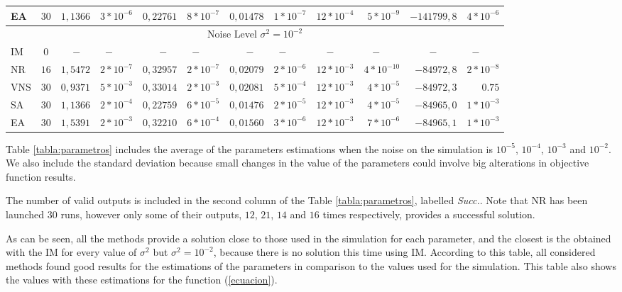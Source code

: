 \documentclass{sig-alternate}
\begin{document}
\begin{table*}
\begin{center}
{\begin{tabular}{lc|rrrrrrrrrr}
EA 		&$30$	&$1,1366$	&$3*10^{-6}$	&$0,22761$	&$8*10^{-7}$	&$0,01478$	&$1*10^{-7}$ 	&$12*10^{-4}$&$5*10^{-9}$	& $-141799,8$&$4*10^{-6}$\\
\hline
\multicolumn{12}{c}{Noise Level $\sigma^2=10^{-2}$} \\
\hline
IM 		&$0$ 	&$-\quad$&$ -\qquad$    		&$-\quad$&$-\qquad$    			&$-\quad$&$ -\qquad$    			&$-\qquad$&$-\qquad$				 &$-\qquad$			&$-\qquad$		\\
NR 	&$16$	&$1,5472$&$2*10^{-7}$	&$0,32957$&$2*10^{-7}$	&$0,02079$&$2*10^{-6}$ 	&$12*10^{-3}$&$4*10^{-10}$	&$-84972,8$		&$2*10^{-8}$\\
VNS 	&$30$	&$0,9371$&$5*10^{-3}$	&$0,33014$&$2*10^{-3}$	&$0,02081$&$5*10^{-4}$   &$12*10^{-3}$&$4*10^{-5}$ 	&$-84972,3$		&$0.75$		\\
SA 		&$30$	&$1,1366$&$2*10^{-4}$	&$0,22759$&$6*10^{-5}$	&$0,01476$&$2*10^{-5}$ 	&$12*10^{-3}$&$4*10^{-5}$	&$-84965,0$		&$1*10^{-3}$ \\
EA 		&$30$	&$1,5391$&$2*10^{-3}$	&$0,32210$&$6*10^{-4}$	&$0,01560$&$3*10^{-6}$ 	&$12*10^{-3}$&$7*10^{-6}$	&$-84965,1$		&$1*10^{-3}$ \\
\hline
\end{tabular}}
\label{tabla:parametros}
\end{center}
\end{table*}


Table \ref{tabla:parametros} includes the average of the parameters estimations when the noise on the simulation is $10^{-5}$, $10^{-4}$, $10^{-3}$ and $10^{-2}$. We also include the standard deviation because  small changes in the value of the parameters could involve big alterations in objective function results.

The number of valid outputs is included in the second column of the Table \ref{tabla:parametros}, labelled \emph{Succ.}. Note that NR has been launched $30$ runs, however only some of their outputs, $12$, $21$, $14$ and $16$ times respectively, provides a successful solution.

As can be seen, all the methods provide a solution close to those used in the simulation for each parameter, and the closest is the obtained with the IM for every value of $\sigma^2$ but $\sigma^2 =10^{-2}$, because there is no solution this time using IM. According to this table, all considered methods found good results for the estimations of the parameters in comparison to the values used for the simulation. This table also shows the values with these estimations for the function (\ref{ecuacion}).
\end{document}
